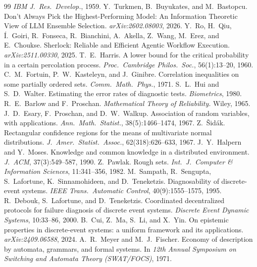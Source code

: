 \documentclass[11pt]{article}
\theoremstyle{definition}
\theoremstyle{remark}
\begin{document}
\begin{thebibliography}{99}
\emph{IBM J.\ Res.\ Develop.}, 1959.
 Y.~Turkmen, B.~Buyukates, and M.~Bastopcu. Don't Always Pick the
Highest-Performing Model: An Information Theoretic View of LLM Ensemble Selection.
\emph{arXiv:2602.08003}, 2026.
 Y.~Ro, H.~Qiu, \'I.~Goiri, R.~Fonseca, R.~Bianchini, A.~Akella, Z.~Wang,
M.~Erez, and E.~Choukse. Sherlock: Reliable and Efficient Agentic Workflow Execution.
\emph{arXiv:2511.00330}, 2025.
 T.~E.~Harris. A lower bound for the critical probability in a certain
percolation process. \emph{Proc.\ Cambridge Philos.\ Soc.}, 56(1):13--20, 1960.
 C.~M.~Fortuin, P.~W.~Kasteleyn, and J.~Ginibre. Correlation inequalities on some
partially ordered sets. \emph{Comm.\ Math.\ Phys.}, 1971.
 S.~L.~Hui and S.~D.~Walter. Estimating the error rates of diagnostic tests.
\emph{Biometrics}, 1980.
 R.~E.~Barlow and F.~Proschan. \emph{Mathematical Theory of Reliability.}
Wiley, 1965.
 J.~D.~Esary, F.~Proschan, and D.~W.~Walkup. Association of random variables, with
applications. \emph{Ann.\ Math.\ Statist.}, 38(5):1466--1474, 1967.
 Z.~\v{S}id\'ak. Rectangular confidence regions for the means of multivariate
normal distributions. \emph{J.~Amer.\ Statist.\ Assoc.}, 62(318):626--633, 1967.
 J.~Y.~Halpern and Y.~Moses. Knowledge and common knowledge in a distributed
environment. \emph{J.~ACM}, 37(3):549--587, 1990.
 Z.~Pawlak. Rough sets. \emph{Int.\ J.\ Computer \& Information Sciences},
11:341--356, 1982.
 M.~Sampath, R.~Sengupta, S.~Lafortune, K.~Sinnamohideen, and D.~Teneketzis.
Diagnosability of discrete-event systems. \emph{IEEE Trans.\ Automatic Control}, 40(9):1555--1575, 1995.
 R.~Debouk, S.~Lafortune, and D.~Teneketzis. Coordinated decentralized protocols
for failure diagnosis of discrete event systems. \emph{Discrete Event Dynamic Systems}, 10:33--86, 2000.
 B.~Cui, Z.~Ma, S.~Li, and X.~Yin. On epistemic properties in discrete-event
systems: a uniform framework and its applications. \emph{arXiv:2409.06588}, 2024.
 A.~R.~Meyer and M.~J.~Fischer. Economy of description by automata, grammars,
and formal systems. In \emph{12th Annual Symposium on Switching and Automata Theory (SWAT/FOCS)}, 1971.

\end{thebibliography}
\end{document}
